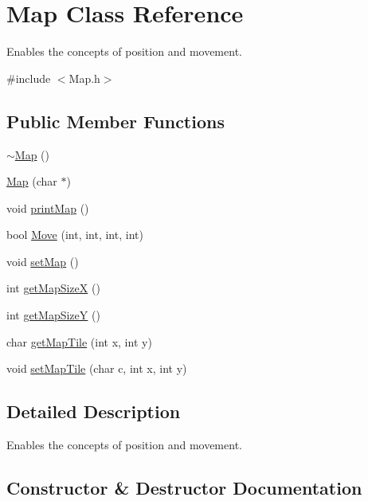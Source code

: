 \hypertarget{class_map}{}\section{Map Class Reference}
\label{class_map}


Enables the concepts of position and movement.  




{\ttfamily \#include $<$Map.\+h$>$}

\subsection*{Public Member Functions}
\begin{DoxyCompactItemize}
\item 
\hyperlink{class_map_aa403fbe09394ccf39747588f5168e3b2}{$\sim$\+Map} ()
\item 
\hyperlink{class_map_ac799bd535a5174700b11ebf7fa2c62e4}{Map} (char $\ast$)
\item 
void \hyperlink{class_map_a1cefc1b8ed6692667e2019f64acc0f5a}{print\+Map} ()
\item 
bool \hyperlink{class_map_af5d2cdc79ed8fb0ea8c9b8eb649a1046}{Move} (int, int, int, int)
\item 
void \hyperlink{class_map_adec4a268e6a6eb539595a32e7edfa27a}{set\+Map} ()
\item 
int \hyperlink{class_map_a2960ea8c9260e0b6e59860c3a29b1689}{get\+Map\+Size\+X} ()
\item 
int \hyperlink{class_map_a47c7f7c1422f039670062c01dbb95c7f}{get\+Map\+Size\+Y} ()
\item 
char \hyperlink{class_map_aa2e6440872eabd43083a73909ba60464}{get\+Map\+Tile} (int x, int y)
\item 
void \hyperlink{class_map_ad46f1eba1dcd394581f9cab3ae8d5256}{set\+Map\+Tile} (char c, int x, int y)
\end{DoxyCompactItemize}


\subsection{Detailed Description}
Enables the concepts of position and movement. 

\subsection{Constructor \& Destructor Documentation}
\hypertarget{class_map_aa403fbe09394ccf39747588f5168e3b2}{}
